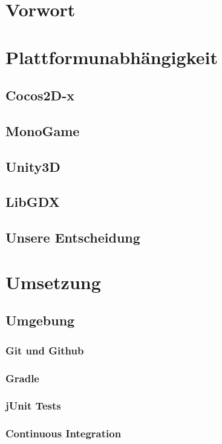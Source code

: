 \section{Vorwort}									\clearpage
\section{Plattformunabhängigkeit}					
	\subsection{Cocos2D-x}							
	\subsection{MonoGame}							
	\subsection{Unity3D}							
	\subsection{LibGDX}								
	\subsection{Unsere Entscheidung}				\clearpage
\section{Umsetzung}
	\subsection{Umgebung}
		\subsubsection{Git und Github}				\clearpage
		\subsubsection{Gradle}						\clearpage
		\subsubsection{jUnit Tests}					\clearpage
		\subsubsection{Continuous Integration}		\clearpage
